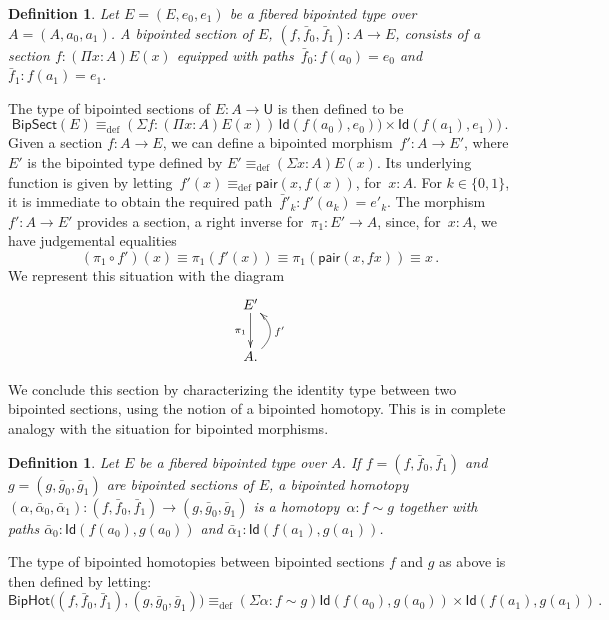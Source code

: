\documentclass[10pt,a4paper,oneside,reqno]{amsart}
\numberwithin{equation}{section}
\theoremstyle{mythm}
\theoremstyle{mydef}
\newtheorem{definition}[theorem]{Definition}
\theoremstyle{myrmk}
\newcommand{\ie}{\text{i.e.\ }}
\newcommand{\deq}{\equiv}
\newcommand{\defeq}{\deq_{\mathrm{def}}}
\newcommand{\co}{\colon}
\newcommand{\pair}{\mathsf{pair}}
\newcommand{\Id}{\mathsf{Id}}
\newcommand{\UU}{\mathsf{U}}
\newcommand{\BipSect}{\mathsf{BipSect}}
\newcommand{\BipHot}{\mathsf{BipHot}}
\begin{document}
\begin{definition} \label{def:fibsection} Let $E = (E, e_0, e_1)$ be a fibered bipointed type over
$A = (A, a_0, a_1)$.  A \emph{bipointed section} of $E$, $(f, \bar{f}_0, \bar{f}_1) \co A \to E$, 
consists of a section $f \co (\Pi x \co A) E(x)$ equipped with paths~$\bar{f}_0 \co f(a_0) = e_0$ 
and $\bar{f}_1 \co f(a_1) = e_1$. \end{definition} 


The type of bipointed sections of $E \co A \to \UU$ is then defined to be
\[
\BipSect(E) \defeq (\Sigma f \co (\Pi x : A) E(x)) \, \Id( f(a_0), e_0)) \times \Id ( f(a_1), e_1)) \, .
\]
Given a section $f \co A \to E$, we can define a bipointed morphism~$f'  \co A \to E'$, where $E'$ is the
bipointed type defined by $E' \defeq (\Sigma x :A) E(x)$. Its underlying function is given by 
letting~$f'(x) \defeq \pair(x, f(x))$, for~$x : A$. For $k \in \{ 0, 1 \}$, it is 
immediate to obtain the required path~$\bar{f}'_k \co f'(a_k) = e'_k$.
The morphism $f' \co A \to E'$ provides a section, \ie a right inverse for~$\pi_1 \co E' \to A$,
 since, for~$x \co A$, we have judgemental equalities
\[
 (\pi_1 \circ f')(x) \deq \pi_1 (f'(x)) \deq \pi_1 (\pair(x, f x)) \deq x \, .
\]
 We represent this situation with the diagram
\[
\xymatrix{
E' \ar[d]_{\pi_1} \\
A . \ar@/_1.2pc/[u]_{f'} }
\]


We conclude this section by characterizing the identity type between two bipointed sections, using
the notion of a bipointed homotopy. This is in complete analogy with the situation for bipointed
morphisms.


\begin{definition} \label{def:2cellsection} Let $E$ be a fibered bipointed type over $A$. If $f = (f, \bar{f}_0,\bar{f}_1)$ and $g = (g, \bar{g}_0, \bar{g}_1)$ are bipointed sections of $E$, a \emph{bipointed homotopy} 
$(\alpha, \bar{\alpha}_0, \bar{\alpha}_1) \co (f, \bar{f}_0, \bar{f}_1)  \rightarrow (g, \bar{g}_0, \bar{g}_1)$ 
is a homotopy~$\alpha \co f \sim g$ together with paths $\bar{\alpha}_0 \co \Id( f(a_0),  g(a_0))$ and $\bar{\alpha}_1 \co \Id ( f(a_1) , g(a_1))$. 
\end{definition} 

The type of bipointed homotopies between bipointed sections $f$ and $g$ as above is then defined by letting:
\[
\BipHot \big( (f, \bar{f}_0, \bar{f}_1), (g, \bar{g}_0, \bar{g}_1) \big) \defeq
(\Sigma \alpha \co f \sim g) \Id ( f(a_0), g(a_0) ) \times \Id ( f(a_1) , g(a_1) ) \, .
\]
\end{document}
